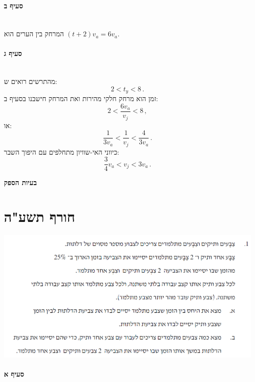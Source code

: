 \documentclass[12pt,a4paper]{article}
\begin{document}
\paragraph{סעיף ב}\mbox{}\\

המרחק בין הערים הוא 
$(t+2)v_a=6v_a$.


\paragraph{סעיף ג}\mbox{}\\

מהתרשים רואים ש:
\[
2 < t_y < 8\,.
\]
זמן הוא מרחק חלקי מהירות ואת המרחק חישבנו בסעיף ב:
\[
2 < \frac{6v_a}{v_j} < 8\,,
\]
או:
\[
\frac{1}{3v_a} < \frac{1}{v_j} < \frac{4}{3v_a}\,.
\]
כיווני האי-שוויון מתחלפים עם היפוך השבר:
\[
\frac{3}{4}v_a < v_j < 3v_a\,.
\]

\newpage


\begin{center}
\textbf{\huge
בעיות הספק}
\end{center}


\section*{חורף תשע"ה}

\begin{center}
\includegraphics[width=\textwidth]{winter-2015-1}
\end{center}

\paragraph{סעיף א}
\end{document}
